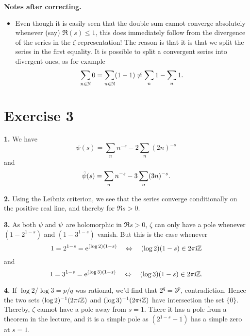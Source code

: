 \documentclass[a4paper,11pt]{article}
\begin{document}
\textbf{Notes after correcting.} \leavevmode
\begin{itemize}
    \item Even though it is easily seen that the double sum cannot converge
        absolutely whenever (say) $\Re(s) \leq 1$, this does immediately follow
        from the divergence of the series in the $\zeta$-representation! The reason is that
        it is that we split the series in the first equality. It is
        possible to split a convergent series into divergent ones, as for example
        \[
            \sum_{n \in \mathbb{N}} 0 = \sum_{n \in \mathbb{N}} (1-1) \neq \sum_n 1 - \sum_n 1.
        \]
\end{itemize}

\section*{Exercise 3}
\textbf{1.} We have
\[
    \psi(s) = \sum_{n} n^{-s} - 2 \sum_n (2n)^{-s}
\]
and 
\[
    \Tilde \psi(s) = \sum_{n} n^{-s} - 3 \sum_n (3n)^{-s}.
\]

\textbf{2.} Using the Leibniz criterion, we see that the series converge conditionally on the
positive real line, and thereby for $\Re s > 0$. 

\textbf{3.} As both $\psi$ and $\Tilde \psi$ are holomorphic in $\Re s > 0$, $\zeta$ can only
have a pole whenever $(1-2^{1-s})$ and $(1-3^{1-s})$ vanish. But this is the case whenever 
\[
    1 = 2^{1-s} = \mathrm e^{(\log 2)(1-s)} \quad \Leftrightarrow \quad (\log 2)(1-s) \in 
    2 \pi \mathrm i \mathbb{Z}
\]
and 
\[
    1 = 3^{1-s} = \mathrm e^{(\log 3)(1-s)} \quad \Leftrightarrow \quad (\log 3)(1-s) \in 
    2 \pi \mathrm i \mathbb{Z}.
\]

\textbf{4.} If $\log 2 / \log 3 = p/q$ was rational, we'd find that $2^q = 3^p$, contradiction.
Hence the two sets $(\log 2)^{-1} (2 \pi i \mathbb{Z})$ and $(\log 3)^{-1}( 2 \pi i \mathbb{Z})$ have intersection the set
$\{0\}$. Thereby, $\zeta$ cannot have a pole away from $s = 1$. There it has a pole from a 
theorem in the lecture, and it is a simple pole as $(2^{1-s}-1)$ has a simple zero at $s=1$. 
\end{document}
